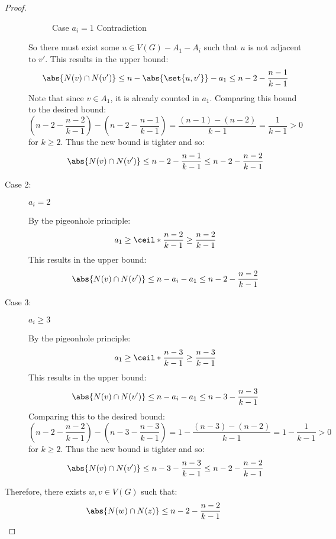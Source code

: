 \begin{proof}
\begin{description}
    \begin{figure}[h]
      \label{fig:aione}
      \begin{center}
      \end{center}
      \caption{Case \(a_i=1\) Contradiction}
    \end{figure}

    So there must exist some \(u\in V(G)-A_1-A_i\) such that \(u\) is not adjacent to \(v'\).  This results in the
    upper bound:
    \[\abs{N(v)\cap N(v')}\le n-\abs{\set{u,v'}}-a_1\le n-2-\frac{n-1}{k-1}\]
    Note that since \(v\in A_1\), it is already counted in \(a_1\).  Comparing this bound to the desired bound:
    \[\left(n-2-\frac{n-2}{k-1}\right)-\left(n-2-\frac{n-1}{k-1}\right)=\frac{(n-1)-(n-2)}{k-1}=\frac{1}{k-1}>0\]
    for \(k\ge2\).  Thus the new bound is tighter and so:
    \[\abs{N(v)\cap N(v')}\le n-2-\frac{n-1}{k-1}\le n-2-\frac{n-2}{k-1}\]
    
  \item [Case 2:] \(a_i=2\)

    By the pigeonhole principle:
    \[a_1\ge\ceil*{\frac{n-2}{k-1}}\ge\frac{n-2}{k-1}\]
    This results in the upper bound:
    \[\abs{N(v)\cap N(v')}\le n-a_i-a_1\le n-2-\frac{n-2}{k-1}\]
    
  \item [Case 3:] \(a_i\ge3\)

    By the pigeonhole principle:
    \[a_1\ge\ceil*{\frac{n-3}{k-1}}\ge\frac{n-3}{k-1}\]
    This results in the upper bound:
    \[\abs{N(v)\cap N(v')}\le n-a_i-a_1\le n-3-\frac{n-3}{k-1}\]
    Comparing this to the desired bound:
    \[\left(n-2-\frac{n-2}{k-1}\right)-\left(n-3-\frac{n-3}{k-1}\right)=1-\frac{(n-3)-(n-2)}{k-1}=1-\frac{1}{k-1}>0\]
    for \(k\ge2\).  Thus the new bound is tighter and so:
    \[\abs{N(v)\cap N(v')}\le n-3-\frac{n-3}{k-1}\le n-2-\frac{n-2}{k-1}\]
  \end{description}

  Therefore, there exists \(w,v\in V(G)\) such that:
  \[\abs{N(w)\cap N(z)}\le n-2-\frac{n-2}{k-1}\]
\end{proof}

